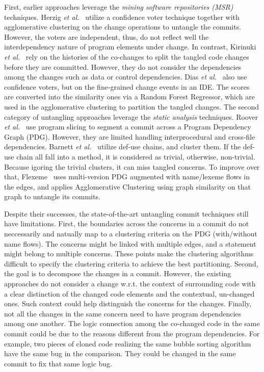 First, earlier approaches leverage the {\em mining software
  repositories (MSR)} techniques. Herzig {\em et
  al.}~\cite{kim-msr13,kim-emse16} utilize a confidence voter
technique together with agglomerative clustering on the change
operations to untangle the commits.
However, the voters are independent, thus, do not reflect well the
interdependency nature of program elements under change. In contrast,
Kirinuki {\em et al.}~\cite{higo-apsec16, higo-icpc14} rely on the
histories of the co-changes to split the tangled code changes before
they are committed. However, they do not consider the dependencies
among the changes such as data or control dependencies. Dias {\em et
  al.}~\cite{dias-saner15} also use confidence voters, but on the
fine-grained change events in an IDE. The scores are converted into
the similarity ones via a Random Forest Regressor, which are used in
the agglomerative clustering to partition the tangled changes.  The
second category of untangling approaches leverage the {\em static
  analysis} techniques. Roover {\em et al.}~\cite{roover-scam18} use
program slicing to segment a commit across a Program Dependency Graph
(PDG).  However, they are limited handling interprocedural and
cross-file dependencies. Barnett {\em et al.}~\cite{barnett-icse15}
utilize def-use chains, and cluster them. If the def-use chain all
fall into a method, it is considered as trivial, otherwise,
non-trivial. Because igoring the trivial clusters, it can miss tangled
concerns. To improve over that, Flexeme~\cite{flexeme-fse20} uses
multi-version PDG augmented with name/lexeme flows in the edges, and
applies Agglomerative Clustering using graph similarity on that graph
to untangle its commits.

Despite their successes, the state-of-the-art untangling commit
techniques still have limitations. First, the boundaries across the
concerns in a commit do not neccessarily and natually map to a
clustering criteria on the PDG (with/without name flows). The concerns
might be linked with multiple edges, and a statement might belong to
multiple concerns.  These points make the clustering algorithms
difficult to specify the clustering criteria to achieve the best
partitioning. Second, the goal is to decompose the changes in a
commit. However, the existing approaches do not consider a change
w.r.t. the context of surrounding code with a clear distinction of the
changed code elements and the contextual, un-changed ones. Such
context could help distinguish the concerns for the changes. Finally,
not all the changes in the same concern need to have program
dependencies among one another. The logic connection among the
co-changed code in the same commit could be due to the reasons
different from the program dependencies. For example, two pieces of
cloned code realizing the same bubble sorting algorithm have the same
bug in the comparison. They could be changed in the same commit to fix
that same logic bug.

